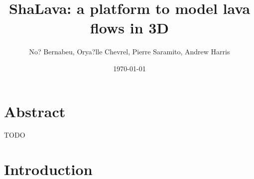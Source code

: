 \documentclass[11pt,a4paper]{article}
\title{ShaLava: a platform to model lava flows in 3D}
\author{No? Bernabeu, Orya?lle Chevrel, Pierre Saramito, Andrew Harris}
\date\today
\begin{document}
 
\maketitle
\linenumbers

\section*{Abstract} 
TODO


\section{Introduction}
\end{document}
